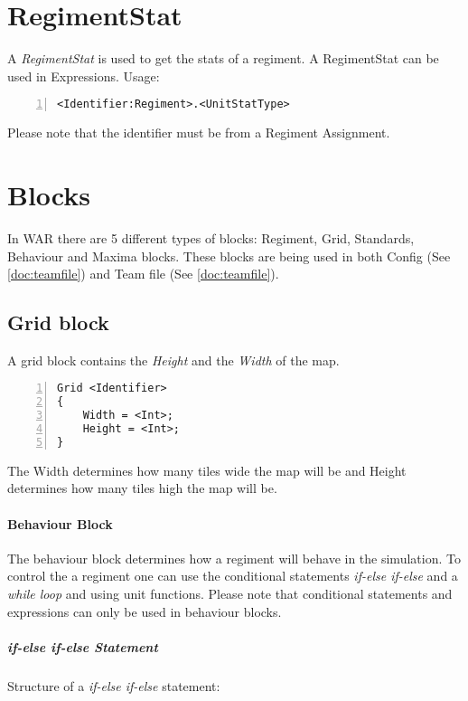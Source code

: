 \section{RegimentStat}
	A {\it RegimentStat} is used to get the stats of a regiment. A RegimentStat can be used in Expressions. Usage:\\

		\begin{lstlisting}[basicstyle=\small\sffamily,
		keywordstyle={\color{blue}},
		comment={[l]{//}}, morecomment={[s]{/*}{*/}}, commentstyle=\itshape,
		columns={[l]flexible}, numbers=left, numberstyle=\tiny,
		frameround=fftt, frame=shadowbox, captionpos=b,
		caption={Regiment Stat}]
<Identifier:Regiment>.<UnitStatType>
	\end{lstlisting}
	Please note that the identifier must be from a Regiment Assignment.

\section{Blocks}
\label{doc:blocks}
	In WAR there are 5 different types of blocks: Regiment, Grid, Standards, Behaviour and Maxima blocks. 
	These blocks are being used in both Config (See \ref{doc:teamfile}) and Team file (See \ref{doc:teamfile}).
	\subsection{Grid block}
		A grid block contains the {\it Height} and the {\it Width }of the map.

		\begin{lstlisting}[basicstyle=\small\sffamily,
		keywordstyle={\color{blue}},
		comment={[l]{//}}, morecomment={[s]{/*}{*/}}, commentstyle=\itshape,
		columns={[l]flexible}, numbers=left, numberstyle=\tiny,
		frameround=fftt, frame=shadowbox, captionpos=b,
		caption={Grid Block}]
Grid <Identifier>
{
	Width = <Int>;
	Height = <Int>;
}
		\end{lstlisting}	
		The Width determines how many tiles wide the map will be and Height determines how many tiles high the map will be.
	\paragraph{Behaviour Block}
		The behaviour block determines how a regiment will behave in the simulation. To control the a regiment one can 
		use the conditional statements {\it if-else if-else} and a {\it while loop} and using unit functions. Please note that 
		conditional statements and expressions can only be used in behaviour blocks.
		\subparagraph{if-else if-else Statement}
			Structure of a {\it if-else if-else} statement: \\

